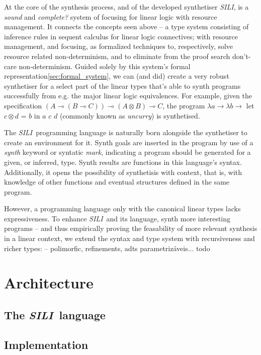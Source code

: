 \documentclass{llncs}
\newcommand{\lolli}{\multimap}
\newcommand{\tensor}{\otimes}
\newcommand{\synname}{\emph{SILI}}
\begin{document}
At the core of the synthesis process, and of the developed synthetiser \synname,
is a \emph{sound} and \emph{complete?} system of focusing for linear logic with
resource management. It connects the concepts seen above -- a type system
consisting of inference rules in sequent calculus for linear logic connectives;
with resource management, and focusing, as formalized techniques to,
respectively, solve resource related non-determinism, and to eliminate from the
proof search don't-care non-determinism.  Guided solely by this system's formal
representation\ref{sec:formal_system}, we can (and did) create a very robust
synthetiser for a select part of the linear types that's able to synth
programs successfully from e.g. the major linear logic equivalences. For example,
given the specification $(A \lolli (B \lolli C)) \lolli (A \tensor B) \lolli C$,
the program $\lambda a \rightarrow \lambda b \rightarrow$ let $c \tensor d$ =
$b$ in $a$ $c$ $d$ (commonly known as \emph{uncurry}) is synthetised.

The \synname\ programming language is naturally born alongside the synthetiser
to create an environment for it. Synth goals are inserted in the program by use
of a \emph{synth} keyword or syntatic \emph{mark}, indicating a program should
be generated for a given, or inferred, type. Synth results are functions in this
language's syntax. Additionally, it opens the possibility of synthetisis with
context, that is, with knowledge of other functions and eventual structures
defined in the same program.

However, a programming language only with the canonical linear types lacks
expressiveness. To enhance \synname\ and its language, synth more interesting
programs -- and thus empirically proving the feasability of more relevant
synthesis in a linear context, we extend the syntax and type system with
recursiveness and richer
types: -- polimorfic, refinements, adts parametrizáveis...  todo



\section{Architecture}

\subsection{The \synname\ language}

\subsection{Implementation}
\end{document}

